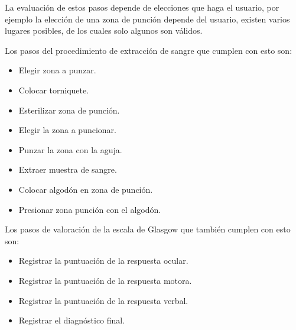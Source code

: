 La evaluación de estos pasos depende de elecciones que haga el usuario, por ejemplo
la elección de una zona de punción depende del usuario, existen varios lugares posibles, 
de los cuales solo algunos son válidos. 

Los pasos del procedimiento de extracción de sangre que cumplen con esto son:
\begin{itemize}
    \item Elegir zona a punzar.
    \item Colocar torniquete.
    \item Esterilizar zona de punción.
    \item Elegir la zona a puncionar.
    \item Punzar la zona con la aguja.
    \item Extraer muestra de sangre.
    \item Colocar algodón en zona de punción.
    \item Presionar zona punción con el algodón.
\end{itemize}

Los pasos de valoración de la escala de Glasgow que también cumplen con esto son:
\begin{itemize}
    \item Registrar la puntuación de la respuesta ocular.
    \item Registrar la puntuación de la respuesta motora.
    \item Registrar la puntuación de la  respuesta verbal.
    \item Registrar el diagnóstico final.
\end{itemize}


